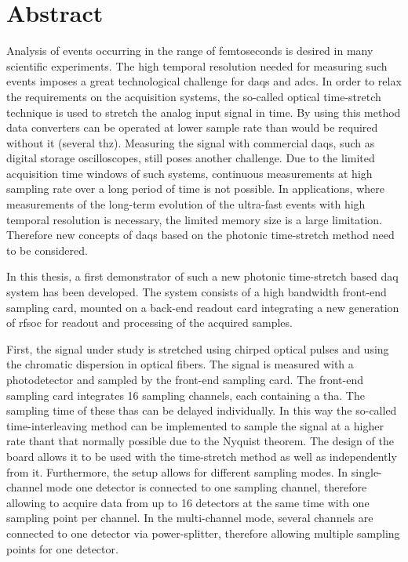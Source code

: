 \chapter*{Abstract}

Analysis of events occurring in the range of femtoseconds is desired in many scientific experiments.
The high temporal resolution needed for measuring such events imposes a great technological challenge for \glspl{daq} and \glspl{adc}.
In order to relax the requirements on the acquisition systems, the so-called optical time-stretch technique is used to stretch the analog input signal in time.
By using this method data converters can be operated at lower sample rate than would be required without it (several \gls{thz}). 
Measuring the signal with commercial \glspl{daq}, such as digital storage oscilloscopes, still poses another challenge.
Due to the limited acquisition time windows of such systems, continuous measurements at high sampling rate over a long period of time is not possible.
In applications, where measurements of the long-term evolution of the ultra-fast events with high temporal resolution is necessary, the limited memory size is a large limitation.
Therefore new concepts of \glspl{daq} based on the photonic time-stretch method need to be considered.

In this thesis, a first demonstrator of such a new photonic time-stretch based \gls{daq} system has been developed.
The system consists of a high bandwidth front-end sampling card, mounted on a back-end readout card integrating a new generation of \gls{rfsoc} for readout and processing of the acquired samples. 

First, the signal under study is stretched using chirped optical pulses and using the chromatic dispersion in optical fibers.
The signal is measured with a photodetector and sampled by the front-end sampling card.
The front-end sampling card integrates 16 sampling channels, each containing a \gls{tha}. 
The sampling time of these \glspl{tha} can be delayed individually.
In this way the so-called time-interleaving method can be implemented to sample the signal at a higher rate thant that normally possible due to the Nyquist theorem.
The design of the board allows it to be used with the time-stretch method as well as independently from it.
Furthermore, the setup allows for different sampling modes.
In single-channel mode one detector is connected to one sampling channel, therefore allowing to acquire data from up to 16 detectors at the same time with one sampling point per channel.
In the multi-channel mode, several channels are connected to one detector via power-splitter, therefore allowing multiple sampling points for one detector. %

